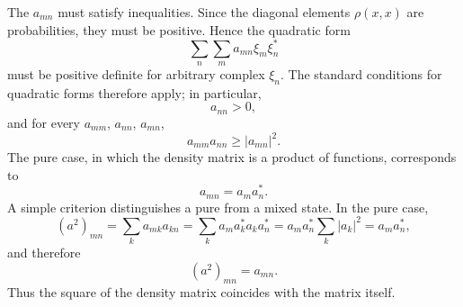 The $a_{mn}$ must satisfy inequalities. Since the diagonal elements
$\rho(x,x)$ are probabilities, they must be positive. Hence the quadratic form
\[
 \sum_n\sum_m a_{mn}\xi_m\xi_n^*
\]
must be positive definite for arbitrary complex $\xi_n$. The standard
conditions for quadratic forms therefore apply; in particular,
\begin{equation}
 a_{nn}>0,
 \tag{14.9}
\end{equation}
and for every $a_{mm}$, $a_{nn}$, $a_{mn}$,
\begin{equation}
 a_{mm}a_{nn}\geq|a_{mn}|^2.
 \tag{14.10}
\end{equation}
The pure case, in which the density matrix is a product of functions,
corresponds to
\begin{equation}
 a_{mn}=a_ma_n^*.
 \tag{14.11}
\end{equation}
A simple criterion distinguishes a pure from a mixed state. In the pure case,
\[
 (a^2)_{mn}=\sum_k a_{mk}a_{kn}
 =\sum_k a_ma_k^*a_ka_n^*=a_ma_n^*\sum_k|a_k|^2=a_ma_n^*,
\]
and therefore
\begin{equation}
 (a^2)_{mn}=a_{mn}.
 \tag{14.12}
\end{equation}
Thus the square of the density matrix coincides with the matrix itself.
